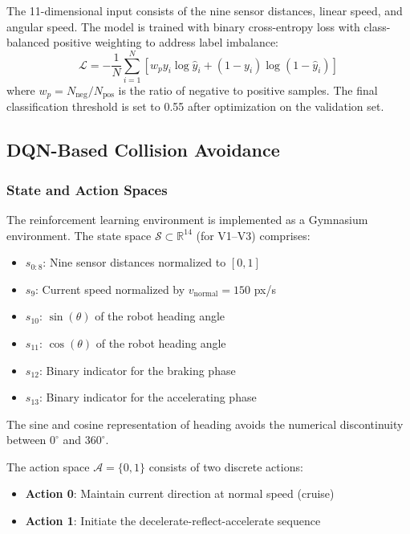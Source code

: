 \documentclass[conference]{IEEEtran}
\begin{document}
The 11-dimensional input consists of the nine sensor distances, linear speed, and angular speed. The model is trained with binary cross-entropy loss with class-balanced positive weighting to address label imbalance:
\begin{equation}
    \mathcal{L} = -\frac{1}{N}\sum_{i=1}^{N} \left[w_p y_i \log \hat{y}_i + (1-y_i) \log(1-\hat{y}_i)\right]
\end{equation}
where $w_p = N_{\text{neg}} / N_{\text{pos}}$ is the ratio of negative to positive samples. The final classification threshold is set to 0.55 after optimization on the validation set.

\subsection{DQN-Based Collision Avoidance}

\subsubsection{State and Action Spaces}

The reinforcement learning environment is implemented as a Gymnasium environment. The state space $\mathcal{S} \subset \mathbb{R}^{14}$ (for V1--V3) comprises:
\begin{itemize}
    \item $s_{0:8}$: Nine sensor distances normalized to $[0, 1]$
    \item $s_9$: Current speed normalized by $v_{\text{normal}} = 150$ px/s
    \item $s_{10}$: $\sin(\theta)$ of the robot heading angle
    \item $s_{11}$: $\cos(\theta)$ of the robot heading angle
    \item $s_{12}$: Binary indicator for the braking phase
    \item $s_{13}$: Binary indicator for the accelerating phase
\end{itemize}

The sine and cosine representation of heading avoids the numerical discontinuity between $0^\circ$ and $360^\circ$.

The action space $\mathcal{A} = \{0, 1\}$ consists of two discrete actions:
\begin{itemize}
    \item \textbf{Action 0}: Maintain current direction at normal speed (cruise)
    \item \textbf{Action 1}: Initiate the decelerate-reflect-accelerate sequence
\end{itemize}
\end{document}
